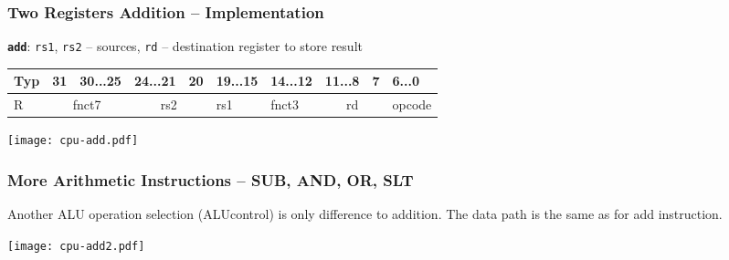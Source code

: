 \documentclass{beamer}
\begin{document}
\begin{frame}[shrink=25]
\frametitle{Two Registers Addition -- Implementation}

\textbf{\texttt{add}}: \texttt{rs1}, \texttt{rs2} -- sources, \texttt{rd} -- destination register to store result

\bigskip

\begin{table}
\footnotesize
\begin{tabular}{|m{0.4cm}|m{0.4cm}|m{1.0cm}|m{1.0cm}|m{0.4cm}|m{1.0cm}|m{1.0cm}|m{1.0cm}|m{0.4cm}|m{1.0cm}|}\hline
Typ & 31 & 30...25 & 24...21 & 20 & 19...15 & 14...12 & 11...8 & 7 & 6...0 \\ \hline
R & \multicolumn{2}{c|}{ fnct7 } & \multicolumn{2}{c|}{ rs2 } & rs1 & fnct3 &\multicolumn{2}{c|}{ rd } & opcode\\ \hline
\end{tabular}
\end{table}

\bigskip

\texttt{[image: cpu-add.pdf]}

\end{frame}


\begin{frame}
\frametitle{More Arithmetic Instructions -- SUB, AND, OR, SLT}

Another ALU operation selection (ALUcontrol) is only difference to addition. The data path is the same as for add instruction.
\bigskip

\bigskip

\texttt{[image: cpu-add2.pdf]}

\end{frame}
\end{document}

